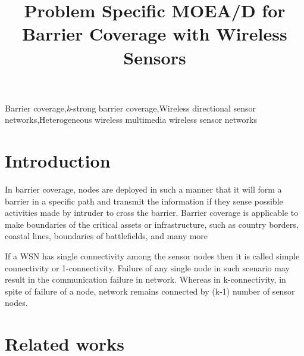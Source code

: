 \documentclass[preprint,12pt]{elsarticle}
\begin{document}
\begin{frontmatter}

    \title{ Problem Specific MOEA/D for Barrier Coverage with Wireless Sensors}




    \begin{abstract}

    \end{abstract}


    \begin{keyword}
        Barrier coverage\sep \textit{k}-strong barrier coverage\sep Wireless directional sensor networks\sep Heterogeneous wireless multimedia wireless sensor networks
    \end{keyword}

\end{frontmatter}

\label{introduction_sec}
\section{Introduction}
In barrier coverage, nodes are deployed in such a manner that it will form a barrier
in a specific path and transmit the information if they sense possible activities made by intruder to cross the barrier. Barrier coverage is applicable to make boundaries of
the critical assets or infrastructure, such as country borders, coastal lines, boundaries
of battlefields, and many more

If a WSN has single connectivity among the sensor nodes then it is called simple connectivity or 1-connectivity. Failure of any single node in such scenario may result in the communication failure in network. Whereas in k-connectivity, in spite of failure of a node, network remains connected by (k-1) number of sensor nodes.
\section{Related works}\label{relatedwork_sec}
\end{document}
